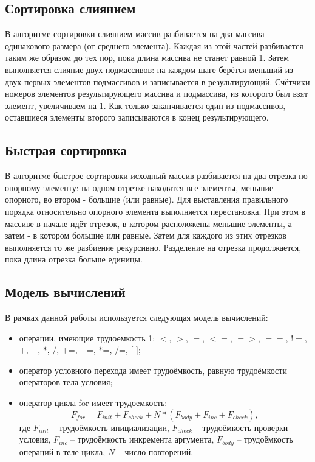 \documentclass[12pt, a4paper]{report}
\begin{document}
	\subsection{Сортировка слиянием}
	В алгоритме сортировки слиянием массив разбивается на два массива одинакового размера (от среднего элемента). Каждая из этой частей разбивается таким же образом до тех пор, пока длина массива не станет равной 1. Затем выполняется слияние двух подмассивов: на каждом шаге берётся меньший из двух первых элементов подмассивов и записывается в результирующий. Счётчики номеров элементов результирующего массива и подмассива, из которого был взят элемент, увеличиваем на 1. Как только заканчивается один из подмассивов, оставшиеся элементы второго записываются в конец результирующего. ~\cite{Merge}
		
	\subsection{Быстрая сортировка}
	В алгоритме быстрое сортировки исходный массив разбивается на два отрезка по опорному элементу: на одном отрезке находятся все элементы, меньшие опорного, во втором - большие (или равные). Для выставления правильного порядка относительно опорного элемента выполняется перестановка. При этом в массиве в начале идёт отрезок, в котором расположены меньшие элементы, а затем - в котором большие или равные. Затем для каждого из этих отрезков выполняется то же разбиение рекурсивно. Разделение на отрезка продолжается, пока длина отрезка больше единицы. ~\cite{Quick}
	
	\subsection{Модель вычислений}
	В рамках данной работы используется следующая модель вычислений:
	\begin{itemize}
		\item операции, имеющие трудоемкость 1: $<$, $>$, $=$, $<=$, $=>$, $==$, $!=$,$+$, $-$, $\ast$, /, $+$=, $-$=, $\ast$=, $/$=, [ ];
		\item оператор условного перехода имеет трудоёмкость, равную трудоёмкости операторов тела условия;
		\item оператор цикла for имеет трудоемкость:
		\begin{equation}
		\label{for_cost}
		F_{for} = F_{init} + F_{check} + N \ast (F_{body} + F_{inc} + F_{check}),
		\end{equation}
		где $F_{init}$ -- трудоёмкость инициализации, $F_{check}$ -- трудоёмкость проверки условия, $F_{inc}$ -- трудоёмкость инкремента аргумента, $F_{body}$ -- трудоёмкость операций в теле цикла, $N$ -- число повторений. ~\cite{AlgAnalysis}
	\end{itemize} 
	
\end{document}
